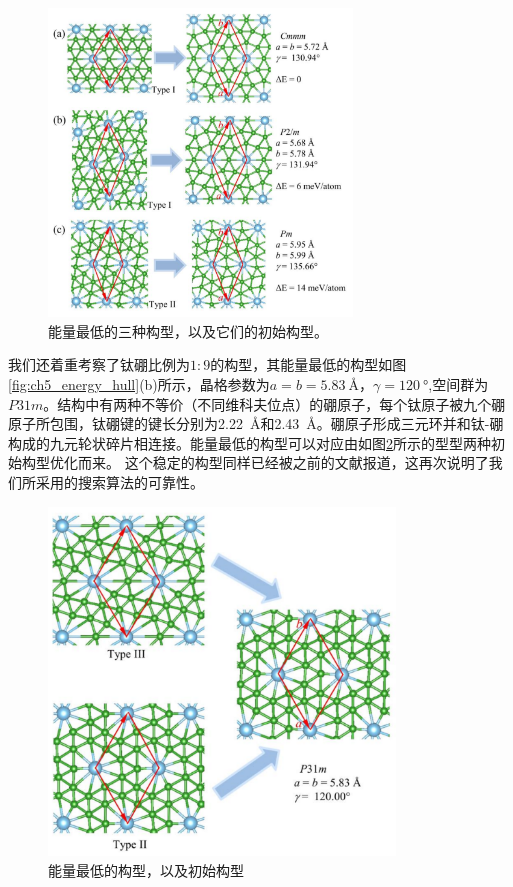 \begin{figure}
  \includegraphics[width=0.72\textwidth]{figs/ch5_tib7_last3.png}
  \centering
  \caption{能量最低的三种构型，以及它们的初始构型。}
  \label{fig:ch5_tib7_last3}
\end{figure}

我们还着重考察了钛硼比例为$1:9$的构型，其能量最低的构型如图\ref{fig:ch5_energy_hull}(b)所示，晶格参数为$a=b=\SI{5.83}{\angstrom}，\gamma=\SI{120}{\degree}$,空间群为$P31m$。结构中有两种不等价（不同维科夫位点）的硼原子，每个钛原子被九个硼原子所包围，钛硼键的键长分别为\SI{2.22}{\angstrom}和\SI{2.43}{\angstrom}。硼原子形成三元环并和钛-硼构成的九元轮状碎片相连接。能量最低的构型可以对应由如图\ref{fig:ch5_tib9}所示的型型两种初始构型优化而来。
这个稳定的构型同样已经被之前的文献\cite{wang2017semimetallic}报道，这再次说明了我们所采用的搜索算法的可靠性。

\begin{figure}
  \includegraphics[width=0.82\textwidth]{figs/ch5_tib9.png}
  \centering
  \caption{能量最低的构型，以及初始构型}
  \label{fig:ch5_tib9}
\end{figure}

